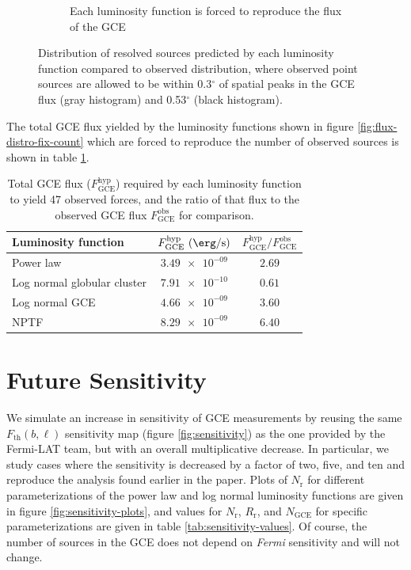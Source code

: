 \documentclass[a4paper,11pt]{article}
\newcommand{\comment}[1]{\emph{\color{red}{#1}}}
\begin{document}
\begin{figure}
\begin{subfigure}[b]{0.47\textwidth}
        \caption{Each luminosity function is forced to reproduce the flux of the GCE}
        \label{fig:flux-distro-fix-flux}
    \end{subfigure}
    \caption{Distribution of resolved sources predicted by each luminosity function compared to observed distribution, where observed point sources are allowed to be within 0.3$^\circ$ of spatial peaks in the GCE flux (gray histogram) and 0.53$^\circ$ (black histogram).}
\end{figure}

The total GCE flux yielded by the luminosity functions shown in figure \ref{fig:flux-distro-fix-count} which are forced to reproduce the number of observed sources is shown in table \ref{tab:rescaled-gce-flux}.

\begin{table}
    \centering
    \begin{tabular} {|l|c|c|}
        \hline
        Luminosity function & $F_\text{GCE}^\text{hyp}\ (\SI{}{\erg\per\second})$ & $F^\text{hyp}_\text{GCE} / F^\text{obs}_\text{GCE}$\\ \hline \hline
        Power law & $\num{3.49e-09}$ & $\num{2.69}$\\
        Log normal globular cluster & $\num{7.91e-10}$ & $\num{0.61}$ \\
        Log normal GCE & $\num{4.66e-09}$ & $\num{3.60}$\\
        NPTF & $\num{8.29e-09}$ & $\num{6.40}$\\
        \hline
    \end{tabular}
    \caption{Total GCE flux ($F_\text{GCE}^\text{hyp}$) required by each luminosity function to yield 47 observed forces, and the ratio of that flux to the observed GCE flux $F_\text{GCE}^\text{obs}$ for comparison.}
    \label{tab:rescaled-gce-flux}
\end{table}



\section{Future Sensitivity}
We simulate an increase in sensitivity of GCE measurements by reusing the same $F_\text{th}(b, \ell)$ sensitivity map (figure \ref{fig:sensitivity}) as the one provided by the Fermi-LAT team, but with an overall multiplicative decrease. In particular, we study cases where the sensitivity is decreased by a factor of two, five, and ten and reproduce the analysis found earlier in the paper. Plots of $N_\text{r}$ for different parameterizations of the power law and log normal luminosity functions are given in figure \ref{fig:sensitivity-plots}, and values for $N_\text{r}$, $R_\text{r}$, and $N_\text{GCE}$ for specific parameterizations are given in table \ref{tab:sensitivity-values}. Of course, the number of sources in the GCE does not depend on \textit{Fermi} sensitivity and will not change. \comment{That means that the backgrounds of the column plots do not change from plot to plot. I could put them all on the same thing.}
\end{document}
